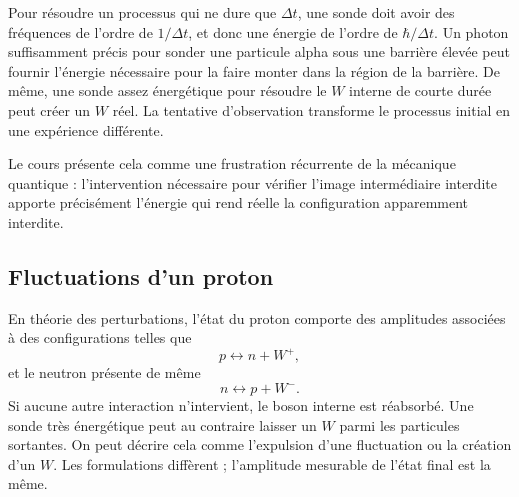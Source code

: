Pour résoudre un processus qui ne dure que \(\Delta t\), une sonde doit avoir des fréquences de l’ordre de \(1/\Delta t\), et donc une énergie de l’ordre de \(\hbar/\Delta t\). Un photon suffisamment précis pour sonder une particule alpha sous une barrière élevée peut fournir l’énergie nécessaire pour la faire monter dans la région de la barrière. De même, une sonde assez énergétique pour résoudre le \(W\) interne de courte durée peut créer un \(W\) réel. La tentative d’observation transforme le processus initial en une expérience différente.

Le cours présente cela comme une frustration récurrente de la mécanique quantique : l’intervention nécessaire pour vérifier l’image intermédiaire interdite apporte précisément l’énergie qui rend réelle la configuration apparemment interdite.

\subsection{Fluctuations d’un proton}

En théorie des perturbations, l’état du proton comporte des amplitudes associées à des configurations telles que
\begin{equation}
  p\longleftrightarrow n+W^+,
\end{equation}
et le neutron présente de même
\begin{equation}
  n\longleftrightarrow p+W^-.
\end{equation}
Si aucune autre interaction n’intervient, le boson interne est réabsorbé. Une sonde très énergétique peut au contraire laisser un \(W\) parmi les particules sortantes. On peut décrire cela comme l’expulsion d’une fluctuation ou la création d’un \(W\). Les formulations diffèrent ; l’amplitude mesurable de l’état final est la même.

\begin{classroomqa}
\end{classroomqa}

